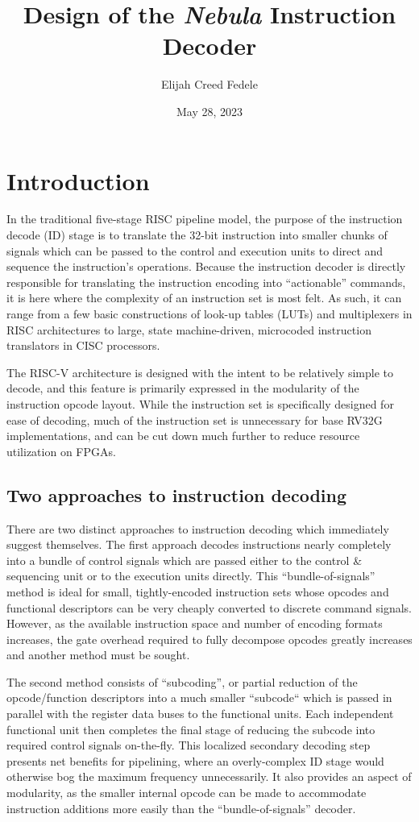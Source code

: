 \documentclass[a4paper,10pt,notitlepage]{article}
\title{Design of the \textit{Nebula} Instruction Decoder}
\author{{Elijah Creed Fedele}}
\date{May 28, 2023}
\begin{document}
	\maketitle
	\onehalfspacing
	\tableofcontents
	
	\section{Introduction}
	
	In the traditional five-stage RISC pipeline model, the purpose of the instruction decode (ID) stage is to translate the 32-bit instruction into smaller chunks of signals which can be passed to the control and execution units to direct and sequence the instruction's operations. Because the instruction decoder is directly responsible for translating the instruction encoding into ``actionable'' commands, it is here where the complexity of an instruction set is most felt. As such, it can range from a few basic constructions of look-up tables (LUTs) and multiplexers in RISC architectures to large, state machine-driven, microcoded instruction translators in CISC processors.
	
	The RISC-V architecture is designed with the intent to be relatively simple to decode, and this feature is primarily expressed in the modularity of the instruction opcode layout. While the instruction set is specifically designed for ease of decoding, much of the instruction set is unnecessary for base RV32G implementations, and can be cut down much further to reduce resource utilization on FPGAs.
	
	\subsection{Two approaches to instruction decoding}
	
	There are two distinct approaches to instruction decoding which immediately suggest themselves. The first approach decodes instructions nearly completely into a bundle of control signals which are passed either to the control \& sequencing unit or to the execution units directly. This ``bundle-of-signals'' method is ideal for small, tightly-encoded instruction sets whose opcodes and functional descriptors can be very cheaply converted to discrete command signals. However, as the available instruction space and number of encoding formats increases, the gate overhead required to fully decompose opcodes greatly increases and another method must be sought.
	
	The second method consists of ``subcoding'', or partial reduction of the opcode/function descriptors into a much smaller ``subcode`` which is passed in parallel with the register data buses to the functional units. Each independent functional unit then completes the final stage of reducing the subcode into required control signals on-the-fly. This localized secondary decoding step presents net benefits for pipelining, where an overly-complex ID stage would otherwise bog the maximum frequency unnecessarily. It also provides an aspect of modularity, as the smaller internal opcode can be made to accommodate instruction additions more easily than the ``bundle-of-signals'' decoder.
	
\end{document}
